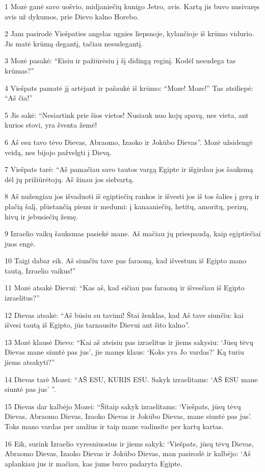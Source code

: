 \par 1 Mozė ganė savo uošvio, midjaniečių kunigo Jetro, avis. Kartą jis buvo nusivaręs avis už dykumos, prie Dievo kalno Horebo. 
\par 2 Jam pasirodė Viešpaties angelas ugnies liepsnoje, kylančioje iš krūmo vidurio. Jis matė krūmą degantį, tačiau nesudegantį. 
\par 3 Mozė pasakė: “Eisiu ir pažiūrėsiu į šį didingą reginį. Kodėl nesudega tas krūmas?” 
\par 4 Viešpats pamatė jį artėjant ir pašaukė iš krūmo: “Moze! Moze!” Tas atsiliepė: “Aš čia!” 
\par 5 Jis sakė: “Nesiartink prie šios vietos! Nusiauk nuo kojų apavą, nes vieta, ant kurios stovi, yra šventa žemė! 
\par 6 Aš esu tavo tėvo Dievas, Abraomo, Izaoko ir Jokūbo Dievas”. Mozė užsidengė veidą, nes bijojo pažvelgti į Dievą. 
\par 7 Viešpats tarė: “Aš pamačiau savo tautos vargą Egipte ir išgirdau jos šauksmą dėl jų prižiūrėtojų. Aš žinau jos sielvartą. 
\par 8 Aš nužengiau jos išvaduoti iš egiptiečių rankos ir išvesti jos iš tos šalies į gerą ir plačią šalį, plūstančią pienu ir medumi: į kanaaniečių, hetitų, amoritų, perizų, hivų ir jebusiečių žemę. 
\par 9 Izraelio vaikų šauksmas pasiekė mane. Aš mačiau jų priespaudą, kaip egiptiečiai juos engė. 
\par 10 Taigi dabar eik. Aš siunčiu tave pas faraoną, kad išvestum iš Egipto mano tautą, Izraelio vaikus!” 
\par 11 Mozė atsakė Dievui: “Kas aš, kad eičiau pas faraoną ir išvesčiau iš Egipto izraelitus?” 
\par 12 Dievas atsakė: “Aš būsiu su tavimi! Štai ženklas, kad Aš tave siunčiu: kai išvesi tautą iš Egipto, jūs tarnausite Dievui ant šito kalno”. 
\par 13 Mozė klausė Dievo: “Kai aš ateisiu pas izraelitus ir jiems sakysiu: ‘Jūsų tėvų Dievas mane siuntė pas jus’, jie manęs klaus: ‘Koks yra Jo vardas?’ Ką turiu jiems atsakyti?” 
\par 14 Dievas tarė Mozei: “AŠ ESU, KURIS ESU. Sakyk izraelitams: ‘AŠ ESU mane siuntė pas jus’ ”. 
\par 15 Dievas dar kalbėjo Mozei: “Šitaip sakyk izraelitams: ‘Viešpats, jūsų tėvų Dievas, Abraomo Dievas, Izaoko Dievas ir Jokūbo Dievas, mane siuntė pas jus’. Toks mano vardas per amžius ir taip mane vadinsite per kartų kartas. 
\par 16 Eik, surink Izraelio vyresniuosius ir jiems sakyk: ‘Viešpats, jūsų tėvų Dievas, Abraomo Dievas, Izaoko Dievas ir Jokūbo Dievas, man pasirodė ir kalbėjo: ‘Aš aplankiau jus ir mačiau, kas jums buvo padaryta Egipte. 
